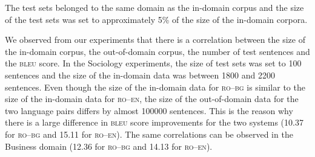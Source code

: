 \documentclass[output=paper]{LSP/langsci}
\begin{document}
The test sets belonged to the same domain as the in-domain corpus and the size of the test sets was set to approximately 5\% of the size of the in-domain corpora.

\begin{table}
\caption{Results of experiments on Sociology in-domain data}
\label{tab:dumavertan:6}
\end{table}

\newpage 
We observed from our experiments that there is a correlation between the size of the in-domain corpus, the out-of-domain corpus, the number of test sentences and the \textsc{bleu} score. In the Sociology experiments, the size of test sets was set to 100 sentences and the size of the in-domain data was between 1800 and 2200 sentences. Even though the size of the in-domain data for \textsc{ro--bg} is similar to the size of the in-domain data for \textsc{ro--en}, the size of the out-of-domain data for the two language pairs differs by almost 100000 sentences. This is the reason why there is a large difference in \textsc{bleu} score improvements for the two systems (10.37 for \textsc{ro--bg} and 15.11 for \textsc{ro--en}). The same correlations can be observed in the Business domain (12.36 for \textsc{ro--bg} and 14.13 for \textsc{ro--en}).
\end{document}
